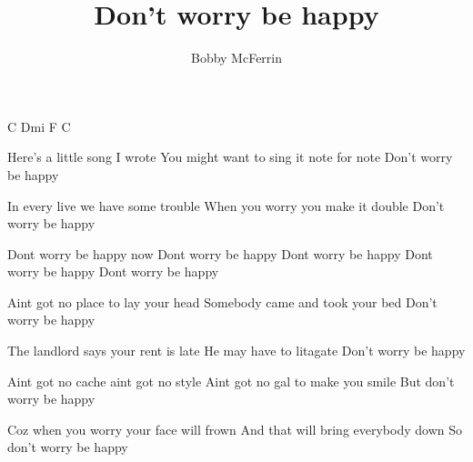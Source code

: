 \beginsong

\title{Don't worry be happy}
\author{Bobby McFerrin}

\intro C Dmi F C

\beginverse
{}Here's a little song I wrote
You might want to sing it note for note
Don't worry be happy
\endverse

\beginverse
{}In every live we have some trouble
When you worry you make it double
Don't worry be happy
\endverse

\beginrefrain
Dont worry be happy now
Dont worry be happy
Dont worry be happy
Dont worry be happy
Dont worry be happy
\endrefrain

\beginverse
{}Aint got no place to lay your head
Somebody came and took your bed
Don't worry be happy
\endverse

\beginverse
{}The landlord says your rent is late
He may have to litagate
Don't worry be happy
\endverse


\beginverse
{}Aint got no cache aint got no style
Aint got no gal to make you smile
But don't worry be happy
\endverse

\beginverse
Coz when you worry your face will frown
And that will bring everybody down
So don't worry be happy
\endverse

